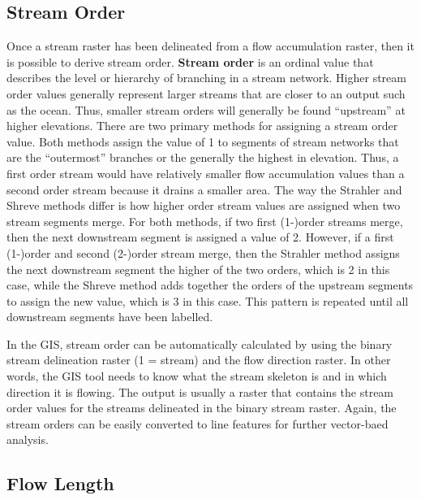 \documentclass[
]{book}
\begin{document}
\hypertarget{stream-order}{%
\subsection{Stream Order}\label{stream-order}}

Once a stream raster has been delineated from a flow accumulation raster, then it is possible to derive stream order. \textbf{Stream order} is an ordinal value that describes the level or hierarchy of branching in a stream network. Higher stream order values generally represent larger streams that are closer to an output such as the ocean. Thus, smaller stream orders will generally be found ``upstream'' at higher elevations. There are two primary methods for assigning a stream order value. Both methods assign the value of 1 to segments of stream networks that are the ``outermost'' branches or the generally the highest in elevation. Thus, a first order stream would have relatively smaller flow accumulation values than a second order stream because it drains a smaller area. The way the Strahler \citep{strahler_quantitative_1957} and Shreve \citep{shreve_statistical_1966} methods differ is how higher order stream values are assigned when two stream segments merge. For both methods, if two first (1-)order streams merge, then the next downstream segment is assigned a value of 2. However, if a first (1-)order and second (2-)order stream merge, then the Strahler method assigns the next downstream segment the higher of the two orders, which is 2 in this case, while the Shreve method adds together the orders of the upstream segments to assign the new value, which is 3 in this case. This pattern is repeated until all downstream segments have been labelled.

In the GIS, stream order can be automatically calculated by using the binary stream delineation raster (1 = stream) and the flow direction raster. In other words, the GIS tool needs to know what the stream skeleton is and in which direction it is flowing. The output is usually a raster that contains the stream order values for the streams delineated in the binary stream raster. Again, the stream orders can be easily converted to line features for further vector-baed analysis.

\hypertarget{flow-length}{%
\subsection{Flow Length}\label{flow-length}}
\end{document}
